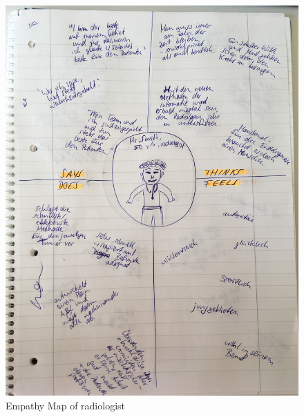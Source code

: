 \begin{figure}[h!]
	\centering
	\includegraphics[width=1\textwidth]{images/empathymap_radiologist.jpg}
	\caption{Empathy Map of radiologist}
	\label{radiologist}
\end{figure}

